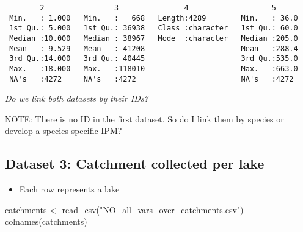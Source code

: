 \documentclass[
]{article}
\newenvironment{Shaded}{\begin{snugshade}}{\end{snugshade}}
\newcommand{\FunctionTok}[1]{\textcolor[rgb]{0.28,0.35,0.67}{#1}}
\newcommand{\NormalTok}[1]{\textcolor[rgb]{0.00,0.23,0.31}{#1}}
\newcommand{\OtherTok}[1]{\textcolor[rgb]{0.00,0.23,0.31}{#1}}
\newcommand{\StringTok}[1]{\textcolor[rgb]{0.13,0.47,0.30}{#1}}
\providecommand{\tightlist}{%
  \setlength{\itemsep}{0pt}\setlength{\parskip}{0pt}}\usepackage{longtable,booktabs,array}
\begin{document}
\begin{verbatim}
       _2               _3              _4                  _5       
 Min.   : 1.000   Min.   :   668   Length:4289        Min.   : 36.0  
 1st Qu.: 5.000   1st Qu.: 36938   Class :character   1st Qu.: 60.0  
 Median :10.000   Median : 38967   Mode  :character   Median :205.0  
 Mean   : 9.529   Mean   : 41208                      Mean   :288.4  
 3rd Qu.:14.000   3rd Qu.: 40445                      3rd Qu.:535.0  
 Max.   :18.000   Max.   :118010                      Max.   :663.0  
 NA's   :4272     NA's   :4272                        NA's   :4272   
\end{verbatim}

\emph{Do we link both datasets by their IDs?}

NOTE: There is no ID in the first dataset. So do I link them by species
or develop a species-specific IPM?

\hypertarget{dataset-3-catchment-collected-per-lake}{%
\subsection{Dataset 3: Catchment collected per
lake}\label{dataset-3-catchment-collected-per-lake}}

\begin{itemize}
\tightlist
\item
  Each row represents a lake
\end{itemize}

\begin{Shaded}
\begin{Highlighting}[]
\NormalTok{catchments }\OtherTok{\textless{}{-}} \FunctionTok{read\_csv}\NormalTok{(}\StringTok{"NO\_all\_vars\_over\_catchments.csv"}\NormalTok{)}
\FunctionTok{colnames}\NormalTok{(catchments)}
\end{Highlighting}
\end{Shaded}
\end{document}
